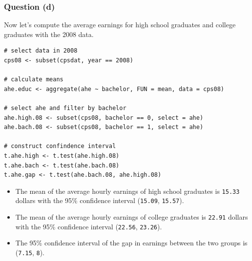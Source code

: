 \documentclass[a4paper,11pt]{article}
\begin{document}
\subsubsection*{Question (d)}
\label{sec:orgbcf0759}

Now let's compute the average earnings for high school graduates and
college graduates with the 2008 data.

\begin{verbatim}
# select data in 2008
cps08 <- subset(cpsdat, year == 2008)

# calculate means
ahe.educ <- aggregate(ahe ~ bachelor, FUN = mean, data = cps08)

# select ahe and filter by bachelor
ahe.high.08 <- subset(cps08, bachelor == 0, select = ahe)
ahe.bach.08 <- subset(cps08, bachelor == 1, select = ahe)

# construct confindence interval
t.ahe.high <- t.test(ahe.high.08)
t.ahe.bach <- t.test(ahe.bach.08)
t.ahe.gap <- t.test(ahe.bach.08, ahe.high.08)
\end{verbatim}

\begin{itemize}
\item The mean of the average hourly earnings of high school graduates is
\texttt{15.33} dollars with the 95\%
confidence interval (\texttt{15.09},
\texttt{15.57}).
\item The mean of the average hourly earnings of college graduates is
\texttt{22.91} dollars with the 95\%
confidence interval (\texttt{22.56},
\texttt{23.26}).
\item The 95\% confidence interval of the gap in earnings between the two
groups is (\texttt{7.15},
\texttt{8}).
\end{itemize}
\end{document}
